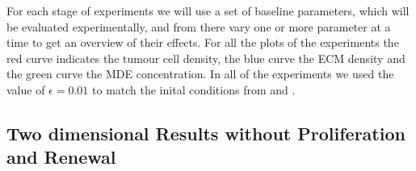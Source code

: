 For each stage of experiments we will use a set of baseline parameters, which will be evaluated experimentally, and from there vary one or more parameter at a time to get an overview of their effects. \newline
For all the plots of the experiments the red curve indicates the tumour cell density, the blue curve the ECM density and the green curve the MDE concentration. In all of the experiments we used the value of $\epsilon = 0.01$ to match the inital conditions from \cite{anderson_mathematical_2000} and \cite{Kolev2010}. \newline 


\subsection{Two dimensional Results without Proliferation and Renewal}

